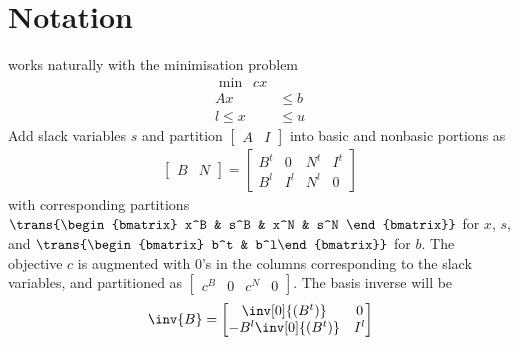 
\section{Notation}
\label{sec:Notation}

\dylp works naturally with the minimisation problem
\begin{equation}
\begin{split}
\min \enspace  cx & \\
      Ax & \leq b \\
l \leq x & \leq u
\end{split} \label{Eqn:BoundedPrimal}
\end{equation}
Add slack variables $s$ and partition $\begin{bmatrix} A & I \end{bmatrix}$
into basic and nonbasic portions as
\begin{equation*}
\begin{split}
\begin{bmatrix} B & N \end{bmatrix} =
\left[
\begin{array}{cc|cc}
B^t & 0 & N^t & I^t \\
B^l & I^l & N^l & 0
\end{array}
\right]
\end{split}
\end{equation*}
with corresponding partitions
\begin{math}
\trans{\begin{bmatrix} x^B & s^B & x^N & s^N \end{bmatrix}}
\end{math}
for $x$, $s$, and
\begin{math}
\trans{\begin{bmatrix} b^t & b^l\end{bmatrix}}
\end{math}
for $b$.
The objective $c$ is augmented with 0's in the columns corresponding to the
slack variables, and partitioned as
\begin{math}
\begin{bmatrix} c^B & 0 & c^N & 0 \end{bmatrix}
\end{math}.
The basis inverse will be 
\begin{equation}
\inv{B} = \begin{bmatrix}
	     \inv[0]{(B^t)} & 0 \\
	     -B^l\inv[0]{(B^t)} & I^l
	    \end{bmatrix}
	    \label{Eqn:PrimalBasisInverse}
\end{equation}
